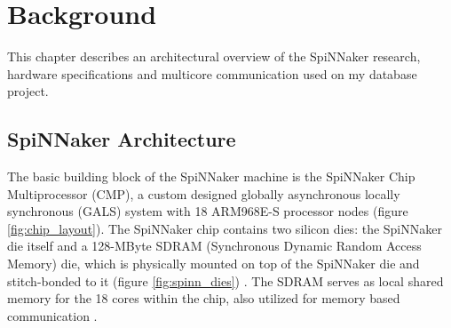 \chapter{Background}
\label{cha:background}
This chapter describes an architectural overview of the SpiNNaker research, hardware specifications and multicore communication used on my database project.

\section{SpiNNaker Architecture}
\label{sec:spinn_arch}

The basic building block of the SpiNNaker machine is the SpiNNaker Chip Multiprocessor (CMP), a custom designed globally asynchronous locally synchronous (GALS) system \cite{painkras} with 18 ARM968E-S processor nodes (figure \ref{fig:chip_layout}). 
The SpiNNaker chip contains two silicon dies: the SpiNNaker die itself and a 128-MByte SDRAM (Synchronous Dynamic Random Access Memory) die, which is physically mounted on top of the SpiNNaker die and stitch-bonded to it (figure \ref{fig:spinn_dies}) \cite{spinnchip}. The SDRAM serves as local shared memory for the 18 cores within the chip, also utilized for memory based communication \cite{datasheet}. 

